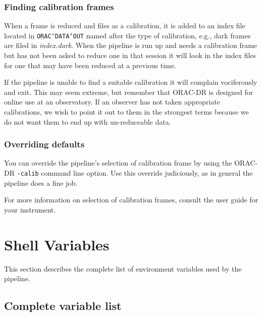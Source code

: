 \documentclass[twoside,11pt]{article}
\newcommand{\underscore}{\leavevmode\kern.04em\vbox{\hrule width 0.4em height 0.3pt}}
\newcommand{\xlabel}[1]{}
\renewcommand{\_}{\texttt{\symbol{95}}}
\begin{document}
\subsubsection*{Finding calibration frames}%

When a frame is reduced and files as a calibration, it is added to an
index file located in {\tt ORAC\char`\_DATA\char`\_OUT} named after the type of
calibration, e.g., dark frames are filed in {\em index.dark\/}. When the
pipeline is run up and needs a calibration frame but has not been
asked to reduce one in that session it will look in the index files
for one that may have been reduced at a previous time. 

If the pipeline is unable to find a suitable calibration it will
complain vociferously and exit. This may seem extreme, but remember
that ORAC-DR is designed for online use at an observatory. If an
observer has not taken appropriate calibrations, we wish to point
it out to them in the strongest terms because we do not want them
to end up with un-reduceable data.

\subsubsection*{Overriding defaults}%

You can override the pipeline's selection of calibration frame by
using the ORAC-DR {\tt -calib} command line option. Use this override
judiciously, as in general the pipeline does a fine job.

For more information on selection of calibration frames, consult the
user guide for your instrument.



\section{Shell Variables\xlabel{shell_variables}}%

This section describes the complete list of environment variables
used by the pipeline.

\subsection*{Complete variable list}%
\end{document}
